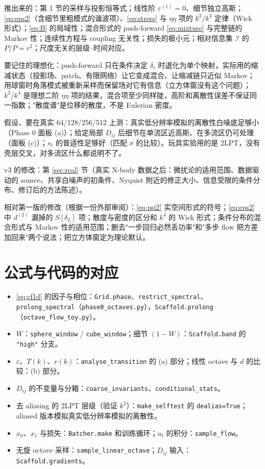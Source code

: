 \documentclass[11pt,UTF8,fontset=none]{ctexart}
\begin{document}
推出来的：第 1 节的采样与投影恒等式；线性阶 $\varepsilon^{(1)}=0$、细节独立高斯；\eqref{eq:eps2}（含细节里粗模式的谐波项）、\eqref{eq:stress} 与 $\eta\eta$ 项的 $k^2/k^4$ 定律（Wick 形式）；\eqref{eq:B} 的局域性；混合形式的 push-forward \eqref{eq:mixture} 与完整链的 Markov 性；连续性方程与 coupling 无关性；损失的极小元；相对信息集 $\mathcal I$ 的 $P/P=r^2$；尺度无关的层级--时间对应。

要记住的理想化：push-forward 只在条件决定 $\delta_c$ 时退化为单个映射，实际用的缩减状态（投影场、patch、有限网络）让它变成混合、让缩减链只近似 Markov；用球窗时角落模式被重新采样而保留场对它有信息（立方体窗没有这个问题）；$k^2/k^4$ 是理想二阶 $\eta\eta$ 项的结果，混合项至少同样陡，高阶和离散性误差不保证同一指数；"散度谱"是位移的散度，不是 Eulerian 密度。

假设、要在真实 64/128/256/512 上测：真实低分辨率模拟的离散性白噪底足够小（Phase 0 面板 (a)）；给定局部 $D_{ij}$ 后细节在单流区近高斯、在多流区仍可处理（面板 (c)）；$s_\ell$ 的普适性足够好（匹配 $\sigma$ 的比较）。玩具实验用的是 2LPT，没有壳层交叉，对多流区什么都说明不了。

v3 的修改：第 \ref{sec:real} 节（真实 N-body 数据之后：微扰论的适用范围、数据驱动的 source、共享白噪声的初条件、Nyquist 附近的修正大小、信息受限的条件分布、修订后的方法陈述）。

相对第一版的修改（根据一份外部审阅）：\eqref{eq:psi2} 实空间形式的符号；\eqref{eq:eps2} 中 $d^{(2)}$ 漏掉的 $S[\delta_L]$ 项；散度与密度的区分和 $k^4$ 的 Wick 形式；条件分布的混合形式与 Markov 性的适用范围；删去"一步回归必然丢功率"和"多步 flow 把方差加回来"两个说法；把立方体窗定为理论默认。

\section*{公式与代码的对应}

\begin{itemize}[leftmargin=1.5em]
\item \eqref{eq:cf1d} 的因子与相位：\texttt{Grid.phase}、\texttt{restrict\_spectral}、\texttt{prolong\_spectral}（\texttt{phase0\_octaves.py}），\texttt{Scaffold.prolong}（\texttt{octave\_flow\_toy.py}）。
\item $W$：\texttt{sphere\_window} / \texttt{cube\_window}；细节 $(1-W)$：\texttt{Scaffold.band} 的 \texttt{"high"} 分支。
\item $\varepsilon$、$T(k)$、$r(k)$：\texttt{analyse\_transition} 的 (a) 部分；线性 octave 与 $d$ 的比较：(b) 部分。
\item $D_{ij}$ 的不变量与分箱：\texttt{coarse\_invariants}、\texttt{conditional\_stats}。
\item 去 aliasing 的 2LPT 层级（验证 $k^2$）：\texttt{make\_selftest} 的 \texttt{dealias=True}；aliased 版本模拟真实低分辨率模拟的离散性。
\item $x_0$、$x_1$ 与损失：\texttt{Batcher.make} 和训练循环；$u_t$ 的积分：\texttt{sample\_flow}。
\item 无旋 octave 采样：\texttt{sample\_linear\_octave}；$D_{ij}$ 输入：\texttt{Scaffold.gradients}。
\end{itemize}
\end{document}

